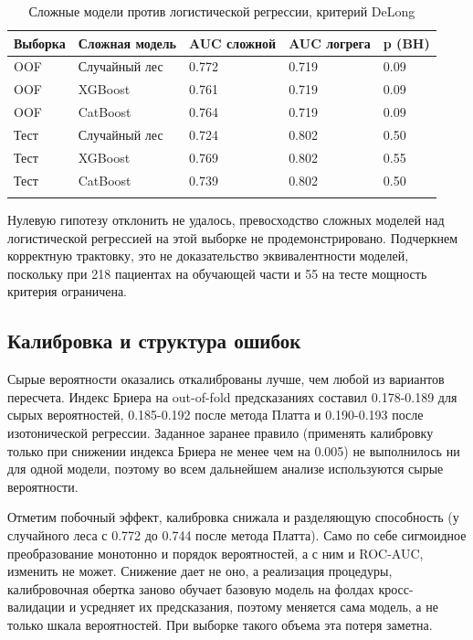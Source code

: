 \documentclass[pdflatex,sn-basic,Numbered]{sn-jnl}
\begin{document}
\begin{table}[h]
\caption{Сложные модели против логистической регрессии, критерий DeLong}\label{tab4}%
\begin{tabular}{@{}lllll@{}}
\toprule
Выборка & Сложная модель & AUC сложной & AUC логрега & p (BH)\\
\midrule
OOF & Случайный лес & 0.772 & 0.719 & 0.09\\
OOF & XGBoost & 0.761 & 0.719 & 0.09\\
OOF & CatBoost & 0.764 & 0.719 & 0.09\\
Тест & Случайный лес & 0.724 & 0.802 & 0.50\\
Тест & XGBoost & 0.769 & 0.802 & 0.55\\
Тест & CatBoost & 0.739 & 0.802 & 0.50\\
\botrule
\end{tabular}
\end{table}

Нулевую гипотезу отклонить не удалось, превосходство сложных моделей над логистической регрессией на этой выборке не продемонстрировано. Подчеркнем корректную трактовку, это не доказательство эквивалентности моделей, поскольку при 218 пациентах на обучающей части и 55 на тесте мощность критерия ограничена.

\subsection{Калибровка и структура ошибок}\label{subsec3_5}

Сырые вероятности оказались откалиброваны лучше, чем любой из вариантов пересчета. Индекс Бриера на out-of-fold предсказаниях составил 0.178-0.189 для сырых вероятностей, 0.185-0.192 после метода Платта и 0.190-0.193 после изотонической регрессии. Заданное заранее правило (применять калибровку только при снижении индекса Бриера не менее чем на 0.005) не выполнилось ни для одной модели, поэтому во всем дальнейшем анализе используются сырые вероятности.

Отметим побочный эффект, калибровка снижала и разделяющую способность (у случайного леса с 0.772 до 0.744 после метода Платта). Само по себе сигмоидное преобразование монотонно и порядок вероятностей, а с ним и ROC-AUC, изменить не может. Снижение дает не оно, а реализация процедуры, калибровочная обертка заново обучает базовую модель на фолдах кросс-валидации и усредняет их предсказания, поэтому меняется сама модель, а не только шкала вероятностей. При выборке такого объема эта потеря заметна.
\end{document}
